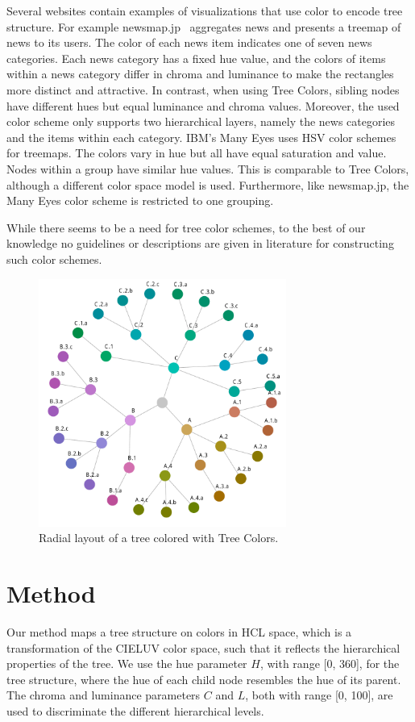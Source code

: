 \documentclass[journal]{vgtc}                %
\begin{document}
Several websites contain examples of visualizations that use color to encode tree structure. For example newsmap.jp~\cite{newsmap} aggregates news and presents a treemap of news to its users. 
The color of each news item indicates one of seven news categories. Each news category has a fixed hue value, and the colors of items within a news category differ in chroma and luminance to make the rectangles more distinct and attractive. In contrast, when using Tree Colors, sibling nodes have different hues but equal luminance and chroma values. Moreover, the used color scheme only supports two hierarchical layers, namely the news categories and the items within each category.
IBM's Many Eyes \cite{manyeyes} uses HSV color schemes for treemaps. The colors vary in hue but all have equal saturation and value. Nodes within a group have similar hue values. This is comparable to Tree Colors, although a different color space model is used. Furthermore, like newsmap.jp, the Many Eyes color scheme is restricted to one grouping.

While there seems to be a need for tree color schemes, to the best of our knowledge no guidelines or 
descriptions are given in literature for constructing such color schemes.

\begin{figure}[!b]

  \centering
  \includegraphics[width=3.2in]{HCPgraph.pdf}
  \caption{Radial layout of a tree colored with Tree Colors.}\label{fig:graph}

\end{figure}


\section{Method}\label{secmethod}
Our method maps a tree structure on colors in HCL space, which is a transformation of the CIELUV color space, such that it reflects the hierarchical properties of the tree. We use the hue parameter $H$, with range [0, 360], for the tree structure, where the hue of each child node resembles the hue of its parent. The chroma and luminance parameters $C$ and $L$, both with range [0, 100], are used to discriminate the different hierarchical levels.
\end{document}
